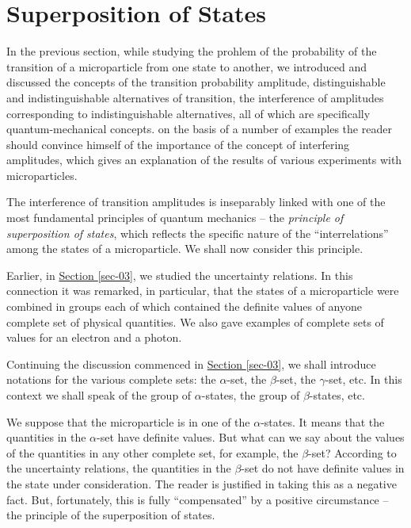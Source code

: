 \documentclass[a4paper,sfsidenotes,colorlinks=true]{tufte-book}
\numberwithin{equation}{section}
\numberwithin{figure}{section}
\begin{document}
\section{Superposition of States}
\label{sec-10}
In the previous section, while studying the prohlem of the probability
of the transition of a microparticle from one state to another, we
introduced and discussed the concepts of the transition probability
amplitude, distinguishable and indistinguishable alternatives of
transition, the interference of amplitudes corresponding to
indistinguishable alternatives, all of which are specifically
quantum-mechanical concepts. on the basis of a number of examples the
reader should convince himself of the importance of the concept of
interfering amplitudes, which gives an explanation of the results of
various experiments with microparticles.

The interference of transition amplitudes is inseparably linked with
one of the most fundamental principles of quantum mechanics -- the
\emph{principle of superposition of states}, which reflects the
specific nature of the ``interrelations'' among the states of a
microparticle. We shall now consider this principle.

Earlier, in \hyperref[sec-03]{Section \ref{sec-03}}, we
 studied the
uncertainty relations. In this connection it was remarked, in
particular, that the states of a microparticle were combined in groups
each of which contained the definite values of anyone complete set of
physical quantities. We also gave examples of complete sets of
values for an electron and a photon. 


Continuing the discussion commenced in \hyperref[sec-03]{Section
  \ref{sec-03}}, we shall introduce notations for the various complete
sets: the $\alpha$-set, the $\beta$-set, the $\gamma$-set, etc. In
this context we shall speak of the group of $\alpha$-states, the group
of $\beta$-states, etc.

We suppose that the microparticle is in one of the $\alpha$-states. It
means that the quantities in the $\alpha$-set have definite
values. But what can we say about the values of the quantities in any
other complete set, for example, the $\beta$-set? According to the
uncertainty relations, the quantities in the $\beta$-set do not have
definite values in the state under consideration. The reader is
justified in taking this as a negative fact. But, fortunately, this is
fully ``compensated'' by a positive circumstance -- the principle of
the superposition of states.
\end{document}
